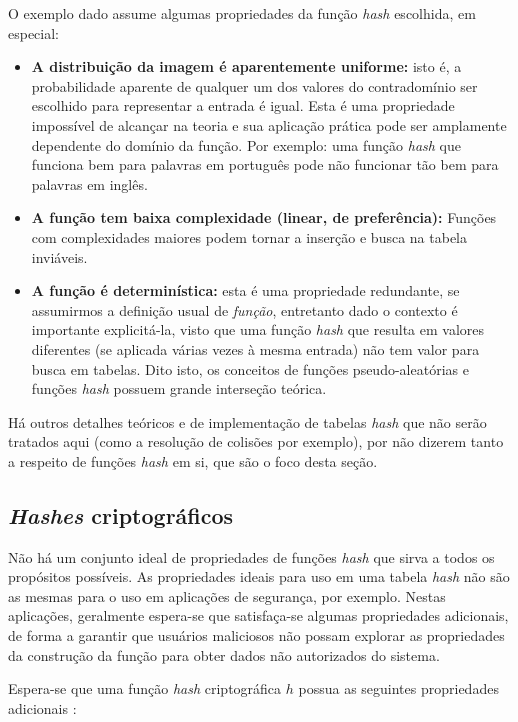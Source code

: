 O exemplo dado assume algumas propriedades da função \emph{hash} escolhida, em especial:
\begin{itemize}
  \item \textbf{A distribuição da imagem é aparentemente uniforme:} isto é, a probabilidade aparente de qualquer um dos valores do contradomínio ser escolhido para representar a entrada é igual. Esta é uma propriedade impossível de alcançar na teoria e sua aplicação prática pode ser amplamente dependente do domínio da função. Por exemplo: uma função \emph{hash} que funciona bem para palavras em português pode não funcionar tão bem para palavras em inglês.
  
  \item \textbf{A função tem baixa complexidade (linear, de preferência):} Funções com complexidades maiores podem tornar a inserção e busca na tabela inviáveis.
  
  \item \textbf{A função é determinística:} esta é uma propriedade redundante, se assumirmos a definição usual de \emph{função}, entretanto dado o contexto é importante explicitá-la, visto que uma função \emph{hash} que resulta em valores diferentes (se aplicada várias vezes à mesma entrada) não tem valor para busca em tabelas. Dito isto, os conceitos de funções pseudo-aleatórias e funções \emph{hash} possuem grande interseção teórica.
\end{itemize}

Há outros detalhes teóricos e de implementação de tabelas \emph{hash} que não serão tratados aqui (como a resolução de colisões por exemplo), por não dizerem tanto a respeito de funções \emph{hash} em si, que são o foco desta seção.

\subsection{\emph{Hashes} criptográficos}\label{sec:hashcripto}

Não há um conjunto ideal de propriedades de funções \emph{hash} que sirva a todos os propósitos possíveis. As propriedades ideais para uso em uma tabela \emph{hash} não são as mesmas para o uso em aplicações de segurança, por exemplo. Nestas aplicações, geralmente espera-se que satisfaça-se algumas propriedades adicionais, de forma a garantir que usuários maliciosos não possam explorar as propriedades da construção da função para obter dados não autorizados do sistema.

Espera-se que uma função \emph{hash} criptográfica $h$ possua as seguintes propriedades adicionais \cite{katz2014introduction}:


